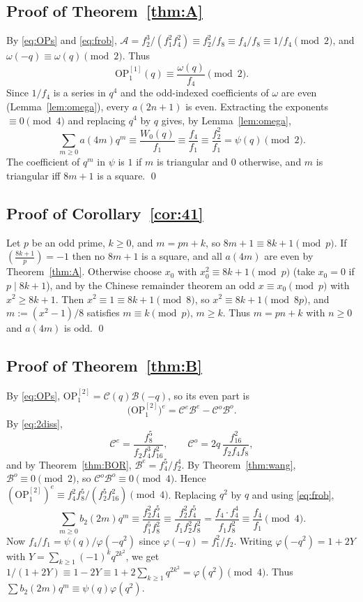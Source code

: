 \documentclass[11pt]{amsart}
\theoremstyle{definition}
\theoremstyle{remark}
\numberwithin{equation}{section}
\newcommand{\OP}{\mathrm{OP}}
\begin{document}
\subsection{Proof of Theorem~\ref{thm:A}}
By \eqref{eq:OPs} and \eqref{eq:frob}, $\mathcal A=f_2^3/(f_1^2f_4^2)\equiv f_2^2/f_8\equiv f_4/f_8\equiv 1/f_4\pmod 2$, and $\omega(-q)\equiv\omega(q)\pmod 2$. Thus
\[
\OP_1^{[1]}(q)\equiv\frac{\omega(q)}{f_4}\pmod 2 .
\]
Since $1/f_4$ is a series in $q^4$ and the odd-indexed coefficients of $\omega$ are even (Lemma~\ref{lem:omega}), every $a(2n+1)$ is even. Extracting the exponents $\equiv0\pmod 4$ and replacing $q^4$ by $q$ gives, by Lemma~\ref{lem:omega},
\[
\sum_{m\ge0}a(4m)q^m\equiv\frac{W_0(q)}{f_1}\equiv\frac{f_4}{f_1}\equiv\frac{f_2^2}{f_1}=\psi(q)\pmod 2 .
\]
The coefficient of $q^m$ in $\psi$ is $1$ if $m$ is triangular and $0$ otherwise, and $m$ is triangular iff $8m+1$ is a square. \qed

\subsection{Proof of Corollary~\ref{cor:41}}
Let $p$ be an odd prime, $k\ge0$, and $m=pn+k$, so $8m+1\equiv 8k+1\pmod p$. If $\left(\frac{8k+1}{p}\right)=-1$ then no $8m+1$ is a square, and all $a(4m)$ are even by Theorem~\ref{thm:A}. Otherwise choose $x_0$ with $x_0^2\equiv8k+1\pmod p$ (take $x_0=0$ if $p\mid8k+1$), and by the Chinese remainder theorem an odd $x\equiv x_0\pmod p$ with $x^2\ge 8k+1$. Then $x^2\equiv1\equiv8k+1\pmod8$, so $x^2\equiv8k+1\pmod{8p}$, and $m:=(x^2-1)/8$ satisfies $m\equiv k\pmod p$, $m\ge k$. Thus $m=pn+k$ with $n\ge0$ and $a(4m)$ is odd. \qed

\subsection{Proof of Theorem~\ref{thm:B}}
By \eqref{eq:OPs}, $\OP_1^{[2]}=\mathcal C(q)\mathcal B(-q)$, so its even part is
\begin{equation}\label{eq:evenOP2}
\big(\OP_1^{[2]}\big)^{e}=\mathcal C^{e}\mathcal B^{e}-\mathcal C^{o}\mathcal B^{o}.
\end{equation}
By \eqref{eq:2diss},
\[
\mathcal C^{e}=\frac{f_8^5}{f_2f_4^3f_{16}^2},\qquad \mathcal C^{o}=2q\,\frac{f_{16}^2}{f_2f_4f_8},
\]
and by Theorem~\ref{thm:BOR}, $\mathcal B^{e}=f_4^5/f_2^4$. By Theorem~\ref{thm:wang}, $\mathcal B^{o}\equiv0\pmod 2$, so $\mathcal C^{o}\mathcal B^{o}\equiv0\pmod 4$. Hence $(\OP_1^{[2]})^{e}\equiv f_4^2f_8^5/(f_2^5f_{16}^2)\pmod 4$. Replacing $q^2$ by $q$ and using \eqref{eq:frob},
\[
\sum_{m\ge0}b_2(2m)q^m\equiv\frac{f_2^2f_4^5}{f_1^5f_8^2}\equiv\frac{f_2^2f_4^5}{f_1f_2^2f_8^2}=\frac{f_4\cdot f_4^4}{f_1f_8^2}\equiv\frac{f_4}{f_1}\pmod 4 .
\]
Now $f_4/f_1=\psi(q)/\varphi(-q^2)$ since $\varphi(-q)=f_1^2/f_2$. Writing $\varphi(-q^2)=1+2Y$ with $Y=\sum_{k\ge1}(-1)^kq^{2k^2}$, we get $1/(1+2Y)\equiv1-2Y\equiv1+2\sum_{k\ge1}q^{2k^2}=\varphi(q^2)\pmod 4$. Thus $\sum b_2(2m)q^m\equiv\psi(q)\varphi(q^2)$.
\end{document}
